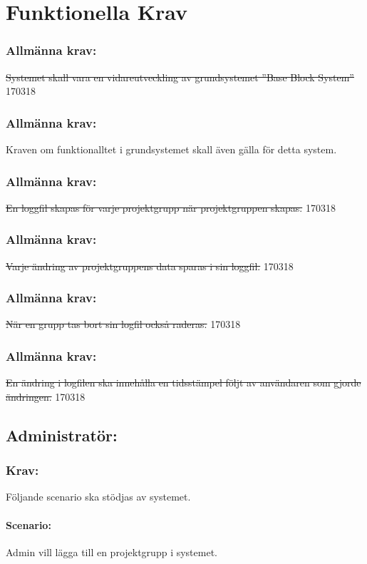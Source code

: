 \documentclass[paper=a4, fontsize=11pt,twoside]{article}
\begin{document}
\section{Funktionella Krav}

\subsubsection{Allmänna krav:}
\sout{Systemet skall vara en vidareutveckling av grundsystemet ''Base Block
System''} 170318
\subsubsection{Allmänna krav:}
Kraven om funktionalltet i grundsystemet skall även gälla för detta system.
\subsubsection{Allmänna krav:}
\sout{En loggfil skapas för varje projektgrupp när projektgruppen skapas.}
170318
\subsubsection{Allmänna krav:}
\sout{Varje ändring av projektgruppens data sparas i sin loggfil.} 170318
\subsubsection{Allmänna krav:}
\sout{När en grupp tas bort sin logfil också raderas.} 170318
\subsubsection{Allmänna krav:}
\sout{En ändring i logfilen ska innehålla en tidsstämpel följt av användaren som
gjorde ändringen.} 170318

\subsection{Administratör:}

\subsubsection{Krav:} Följande scenario ska stödjas av systemet. 
\paragraph{Scenario:}
Admin vill lägga till en projektgrupp i systemet.
\end{document}

